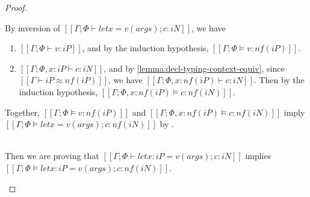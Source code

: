 \begin{proof}
\begin{caseof}
            By inversion of
            $[[Γ; Φ ⊢ let x = v(args); c : iN]]$,
            we have
            \begin{enumerate}
                \item $[[Γ; Φ ⊢ v : iP]]$, 
                    and by the induction hypothesis,
                    $[[Γ; Φ ⊨ v : nf(iP)]]$.
                \item $[[Γ; Φ, x:iP ⊢ c : iN]]$,
                    and by \cref{lemma:decl-typing-context-equiv},
                    since $[[Γ ⊢ iP ≈ nf(iP)]]$, we have
                    $[[Γ; Φ, x:nf(iP) ⊢ c : iN]]$.
                    Then by the induction hypothesis, 
                    $[[Γ; Φ, x:nf(iP) ⊨ c : nf(iN)]]$.
            \end{enumerate}

            Together, $[[Γ; Φ ⊨ v : nf(iP)]]$ and $[[Γ; Φ, x:nf(iP) ⊨ c : nf(iN)]]$
            imply $[[Γ; Φ ⊨ let x = v(args); c : nf(iN)]]$ by .

        \item {}\\
            Then we are proving that 
            $[[Γ ; Φ ⊢ let x:iP = v(args); c : iN]]$
            implies 
            $[[Γ; Φ ⊨ let x:iP = v(args); c : nf(iN)]]$.


\end{caseof}
\end{proof}
